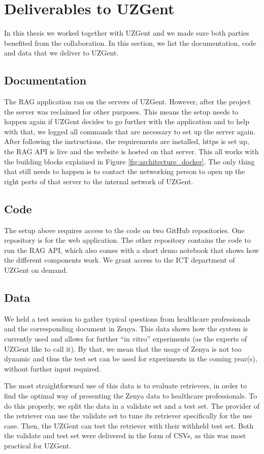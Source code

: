 \chapter{Deliverables to UZGent}

In this thesis we worked together with UZGent and we made sure both parties benefited from the collaboration. In this section, we list the documentation, code and data that we deliver to UZGent.

\section{Documentation}
The RAG application ran on the servers of UZGent. However, after the project the server was reclaimed for other purposes. This means the setup needs to happen again if UZGent decides to go further with the application and to help with that, we logged all commands that are necessary to set up the server again. After following the instructions, the requirements are installed, https is set up, the RAG API is live and the website is hosted on that server. This all works with the building blocks explained in Figure \ref{fig:architecture_docker}. The only thing that still needs to happen is to contact the networking person to open up the right ports of that server to the internal network of UZGent.

\section{Code}
The setup above requires access to the code on two GitHub repositories. One repository is for the web application. The other repository contains the code to run the RAG API, which also comes with a short demo notebook that shows how the different components work. We grant access to the ICT department of UZGent on demand. 

\section{Data}
We held a test session to gather typical questions from healthcare professionals and the corresponding document in Zenya. This data shows how the system is currently used and allows for further ``in vitro'' experiments (as the experts of UZGent like to call it). By that, we mean that the usage of Zenya is not too dynamic and thus the test set can be used for experiments in the coming year(s), without further input required.

The most straightforward use of this data is to evaluate retrievers, in order to find the optimal way of presenting the Zenya data to healthcare professionals. To do this properly, we split the data in a validate set and a test set. The provider of the retriever can use the validate set to tune its retriever specifically for the use case. Then, the UZGent can test the retriever with their withheld test set. Both the validate and test set were delivered in the form of CSVs, as this was most practical for UZGent.

